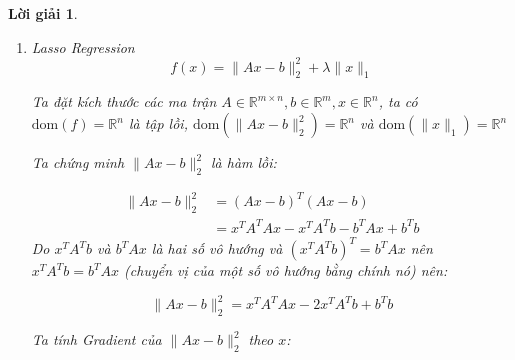 \documentclass[14pt, a4paper]{article}
\theoremstyle{sltheorem}
\theoremstyle{soltheorem}
\newtheorem*{loigiai}{Lời giải}
\begin{document}
\begin{loigiai}
\begin{enumerate} [wide, labelwidth=!, labelindent=0pt,label=\textbf{\arabic*}.]
            Ta xét:

            \begin{equation*}
                p^T \nabla^2 f(x) p = 2 p^T A^T A p + 2\lambda p^Tp = 2 (Ap)^TAp + 2\lambda p^Tp \geq 0 \thickspace\forall \thickspace p \in \mathbb{R}^{n}
            \end{equation*}

            nên:

            \begin{equation*}
                \nabla^2 f(x) \succeq 0 \thickspace \forall x \in \mathbb{R}^{n}
            \end{equation*}

            Vì $\mathrm{dom}(f)$ là tập lồi và $\nabla^2 f(x) \succeq 0$ nên hàm $f(x)$ là một hàm lồi.

            \item Lasso Regression
            \begin{equation*}
                f(x)=\lVert Ax - b \rVert_2^2 + \lambda \lVert x \rVert_1
            \end{equation*}

            Ta đặt kích thước các ma trận $A \in \mathbb{R}^{m \times n}, b \in \mathbb{R}^{m}, x \in \mathbb{R}^{n}$, ta có $\mathrm{dom}(f)=\mathbb{R}^{n}$ là tập lồi,
            $\mathrm{dom}(\lVert Ax - b \rVert_2^2)=\mathbb{R}^n$ và $\mathrm{dom}(\lVert x \rVert_1)=\mathbb{R}^n$

            Ta chứng minh $\lVert Ax - b \rVert_2^2$ là hàm lồi:

            \begin{equation*}
                \begin{aligned}
                    \lVert Ax - b \rVert_2^2&=(Ax-b)^T(Ax-b)\\
                    &=x^TA^TAx - x^TA^Tb - b^TAx + b^Tb
                \end{aligned}
            \end{equation*}
            Do $x^TA^Tb$ và $b^TAx$ là hai số vô hướng và $(x^TA^Tb)^T=b^TAx$ nên $x^TA^Tb=b^TAx$ (chuyển vị của một số vô hướng bằng chính nó) nên:

            \begin{equation*}
                \lVert Ax - b \rVert_2^2=x^TA^TAx - 2x^TA^Tb + b^Tb
            \end{equation*}

            Ta tính Gradient của $\lVert Ax - b \rVert_2^2$ theo $x$:


\end{enumerate}
\end{loigiai}
\end{document}
